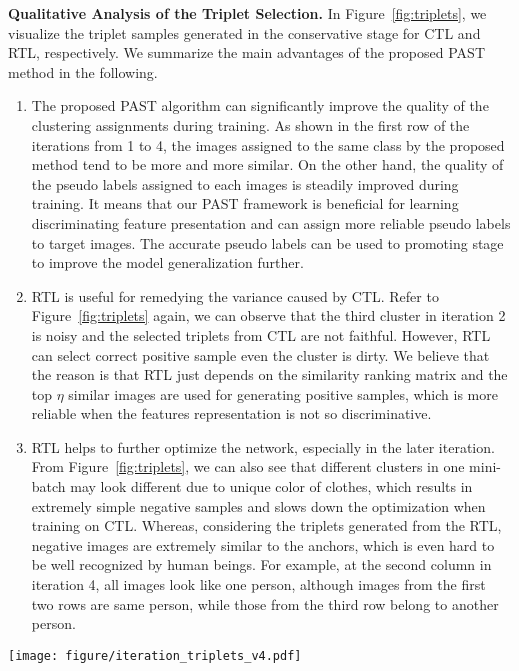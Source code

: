 \documentclass[10pt,twocolumn,letterpaper]{article}
\begin{document}
\textbf{Qualitative Analysis of the Triplet Selection.}
In Figure~\ref{fig:triplets}, we visualize the triplet samples generated in the conservative stage for CTL and RTL, respectively. We summarize the main advantages of the proposed PAST method in the following.
\begin{enumerate}
\item The proposed PAST algorithm can significantly improve the quality of the clustering assignments during training.
As shown in the first row of the iterations from 1 to 4, the images assigned to the same class by the proposed method tend to be more and more similar. On the other hand, the quality of the pseudo labels assigned to each images is steadily improved during training. 
It means that our PAST framework is beneficial for learning discriminating
feature presentation and can assign more reliable pseudo labels to target images. 
The accurate pseudo labels can be used to promoting stage to improve the model generalization further.
\item RTL is useful for remedying the variance caused by CTL. Refer to Figure~\ref{fig:triplets} again, we can observe that the third cluster in iteration 2 is noisy and the selected triplets from CTL are not faithful. 
However, RTL can select correct positive sample even the cluster is dirty. 
We believe that the reason is that RTL just depends on the similarity ranking matrix and the top $\eta$ similar images are used for generating positive samples, which is more reliable when the features representation is not so discriminative. 
\item RTL helps to further optimize the network, especially in the later iteration. From Figure~\ref{fig:triplets}, we can also see that different clusters in one mini-batch may look different due to unique color of clothes, which results in extremely simple negative samples and slows down the optimization when training on CTL. 
Whereas, considering the triplets generated from the RTL, negative images are extremely similar to the anchors, which is even hard to be well recognized by human beings. For example, at the second column in iteration 4, all images look like one person, although images from the first two rows are same person, while those from the third row belong to another person. 
\end{enumerate}

\begin{figure*}[tbp]
\centering
\texttt{[image: figure/iteration\_triplets\_v4.pdf]}
\caption{Quality of the triplet selection over training iterations. Images from different clusters are divided by \textcolor{yellow}{\textbf{yellow line}}. The \textcolor{red}{\textbf{red line}} means generated triplets are not completely correct, while \textcolor{green}{\textbf{green line}} represents generated triplets are completely correct. 
The solid line and dashed line are for triplets, which are generated from CTL and RTL respectively. 
We use Duke~\cite{duke} as the source domain and Market-1501~\cite{market1501} as the target domain.}
\label{fig:triplets}
\end{figure*}
\end{document}
